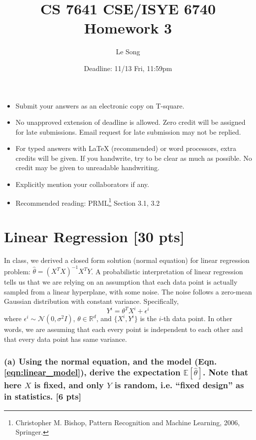 \documentclass[twoside,10pt]{article}
\begin{document}
\title{CS 7641 CSE/ISYE 6740 Homework 3}
\author{Le Song}
\date{Deadline: 11/13 Fri, 11:59pm}
\maketitle

\begin{itemize}
  \item Submit your answers as an electronic copy on T-square.
  \item No unapproved extension of deadline is allowed. Zero credit will be assigned for late submissions. Email request for late submission may not be replied.
  \item For typed answers with LaTeX (recommended) or word processors, extra credits will be given. If you handwrite, try to be clear as much as possible. No credit may be given to unreadable handwriting.
  \item Explicitly mention your collaborators if any.
  \item Recommended reading: PRML\footnote{Christopher M. Bishop, Pattern Recognition and Machine
Learning, 2006, Springer.} Section 3.1, 3.2
\end{itemize}

\section{Linear Regression [30 pts]}

In class, we derived a closed form solution (normal equation) for
linear regression problem: $\hat{\theta} = (X^T X)^{-1} X^T Y$. A
probabilistic interpretation of linear regression tells us that we
are relying on an assumption that each data point is actually
sampled from a linear hyperplane, with some noise. The noise
follows a zero-mean Gaussian distribution with constant variance.
Specifically,
\begin{equation}
Y^i = \theta^T X^i + \epsilon^i
\label{eqn:linear_model}
\end{equation}
where $\epsilon^i \sim \mathcal{N}(0, \sigma^2 I)$, $\theta \in \mathbb{R}^d$, and $\{X^i, Y^i\}$ is the $i$-th data point. In other words,
we are assuming that each every point is independent to each other
and that every data point has same variance.

\subsubsection*{(a) Using the normal equation, and the model (Eqn. \ref{eqn:linear_model}), derive the expectation
$\mathbb{E}[\hat{\theta}]$. Note that here $X$ is fixed, and only $Y$ is random, i.e. ``fixed design'' as in statistics. [6 pts]}
\end{document}
